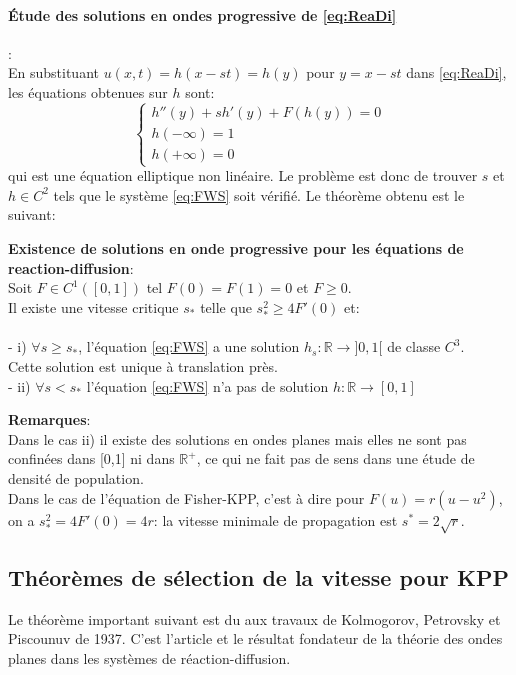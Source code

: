 \paragraph{Étude des solutions en ondes progressive de \eqref{eq:ReaDi}}:\\
En substituant $u(x,t) = h(x-st) = h(y)$ pour $y=x-st$ dans \eqref{eq:ReaDi}, les équations obtenues sur $h$ sont: \begin{equation} \label{eq:FWS} \left\{
                \begin{array}{ll}
                h''(y)+ sh'(y)+F(h(y))=0 \\
                h(-\infty)= 1 \\  h(+\infty) =0 
                   \end{array}
              \right.
\end{equation} 
qui est une équation elliptique non linéaire. Le problème est donc de trouver $s$ et $h \in C^2$ tels que le système \eqref{eq:FWS} soit vérifié. Le théorème obtenu est le suivant:



\begin{theorem}{\textbf{Existence de solutions en onde progressive pour les équations de reaction-diffusion}}:\\
Soit $F \in C^1([0,1])$ tel $F(0)=F(1)=0$ et $F\geq 0$. \\
Il existe une vitesse critique $s_*$ telle que $s_*^2 \geq 4F'(0)$ et: \\ \\
- i) $\forall s \geq s_*$, l'équation \eqref{eq:FWS} a une solution $h_s:\mathbb{R} \rightarrow ]0,1[$ de classe $C^3$.\\ Cette solution est unique à translation près. \\
- ii)  $\forall s<s_*$ l'équation \eqref{eq:FWS} n'a pas de solution $h:\mathbb{R} \rightarrow [0,1]$
\end{theorem}
\textbf{Remarques}:\\
 Dans le cas ii) il existe des solutions en ondes planes mais elles ne sont pas confinées dans [0,1] ni dans $\mathbb{R}^+$, ce qui ne fait pas de sens dans une étude de densité de population.\\
 Dans le cas de l'équation de Fisher-KPP, c'est à dire pour $F(u)=r(u - u^2)$, on a $s_*^2 = 4F'(0) = 4r $: la vitesse minimale de propagation est $s^* =2\sqrt r $.

\newpage
\subsection{Théorèmes de sélection de la vitesse pour KPP}
Le théorème important suivant est du aux travaux de Kolmogorov, Petrovsky et Piscounuv de 1937. C'est l'article et le résultat fondateur de la théorie des ondes planes dans les systèmes de réaction-diffusion. %

